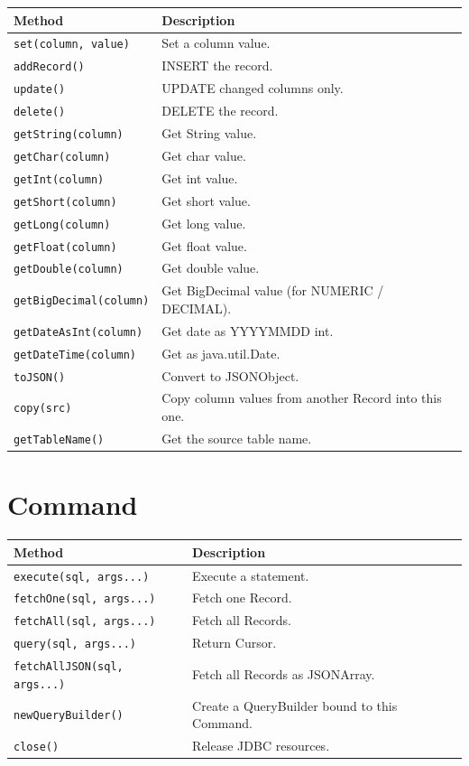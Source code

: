 \begin{longtable}{P{4.8cm}P{5.7cm}}
\toprule
\textbf{Method} & \textbf{Description} \\
\midrule
\endhead
\texttt{set(column, value)} & Set a column value. \\
\texttt{addRecord()} & INSERT the record. \\
\texttt{update()} & UPDATE changed columns only. \\
\texttt{delete()} & DELETE the record. \\
\texttt{getString(column)} & Get String value. \\
\texttt{getChar(column)} & Get char value. \\
\texttt{getInt(column)} & Get int value. \\
\texttt{getShort(column)} & Get short value. \\
\texttt{getLong(column)} & Get long value. \\
\texttt{getFloat(column)} & Get float value. \\
\texttt{getDouble(column)} & Get double value. \\
\texttt{getBigDecimal(column)} & Get BigDecimal value (for NUMERIC / DECIMAL). \\
\texttt{getDateAsInt(column)} & Get date as YYYYMMDD int. \\
\texttt{getDateTime(column)} & Get as java.util.Date. \\
\texttt{toJSON()} & Convert to JSONObject. \\
\texttt{copy(src)} & Copy column values from another Record into this one. \\
\texttt{getTableName()} & Get the source table name. \\
\bottomrule
\end{longtable}

\section{Command}
\label{sec:api-command}

\begin{longtable}{P{4.8cm}P{5.7cm}}
\toprule
\textbf{Method} & \textbf{Description} \\
\midrule
\endhead
\texttt{execute(sql, args...)} & Execute a statement. \\
\texttt{fetchOne(sql, args...)} & Fetch one Record. \\
\texttt{fetchAll(sql, args...)} & Fetch all Records. \\
\texttt{query(sql, args...)} & Return Cursor. \\
\texttt{fetchAllJSON(sql, args...)} & Fetch all Records as JSONArray. \\
\texttt{newQueryBuilder()} & Create a QueryBuilder bound to this Command. \\
\texttt{close()} & Release JDBC resources. \\
\bottomrule
\end{longtable}

